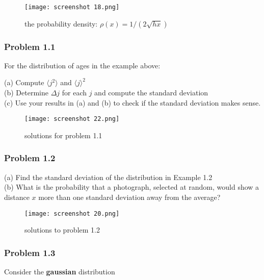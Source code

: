 \documentclass[svgnames]{article}   	%
\begin{document}
\begin{figure}[htb!]
  \centering
    \texttt{[image: screenshot 18.png]}
    \caption{the probability density: $\rho(x) = 1/(2\sqrt{hx})$}
\end{figure}


\subsubsection{Problem 1.1} For the distribution of ages in the example above: 

\begin{tcolorbox}	
  
  (a) Compute $\langle j^2 \rangle$ and $\langle j \rangle^2$ \\
  (b) Determine $\Delta j$ for each $j$ and compute the standard deviation\\
  (c) Use your results in (a) and (b) to check if the standard deviation makes sense. 
  
\end{tcolorbox}	


\begin{figure}[H]
  \centering
    \texttt{[image: screenshot 22.png]}
    \caption{solutions for problem 1.1}
\end{figure}


\subsubsection{Problem 1.2} 

\begin{tcolorbox}	
  
(a) Find the standard deviation of the distribution in Example 1.2\\
(b) What is the probability that a photograph, selected at random, would show
a distance $x$ more than one standard deviation away from the average?

\end{tcolorbox}	

\begin{figure}[H]
  \centering
    \texttt{[image: screenshot 20.png]}
    \caption{solutions to problem 1.2}
\end{figure}

\subsubsection{Problem 1.3} Consider the \textbf{gaussian} distribution 
\end{document}
